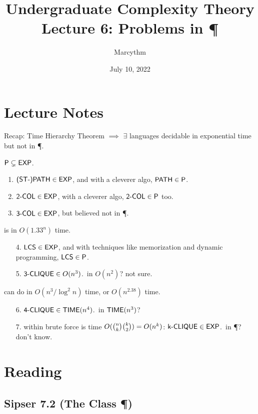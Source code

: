 \documentclass{article}
\title{Undergraduate Complexity Theory \\ Lecture 6: Problems in \P}
\author{Marcythm}
\date{July 10, 2022}
\begin{document}
\maketitle{}

\section{Lecture Notes}

Recap: Time Hierarchy Theorem \(\implies\) \(\exists\) languages decidable in exponential time but not in \P.


\begin{fact}
  \(\text{\sf P} \subsetneq \text{\sf EXP}\).
\end{fact}

\begin{enumerate}
  \item \( \text{\sf (ST-)PATH} \in \text{\sf EXP} \), and with a cleverer algo, \( \text{\sf PATH} \in \text{\sf P} \).
  \item \( \text{\sf 2-COL} \in \text{\sf EXP} \), with a cleverer algo, \( \text{\sf 2-COL} \in \text{\sf P} \) too.
  \item \( \text{\sf 3-COL} \in \text{\sf EXP} \), but believed not in \P.
\end{enumerate}

\begin{theorem}[BE '05]
   is in \(O(1.33^n)\) time.
\end{theorem}

\begin{enumerate}
  \item[4.] \( \text{\sf LCS} \in \text{\sf EXP}\), and with techniques like memorization and dynamic programming, \( \text{\sf LCS} \in \text{\sf P} \).
  \item[5.] \( \text{\sf 3-CLIQUE} \in O(n^3) \).\ in \(O(n^2)\)? not sure.
\end{enumerate}

\begin{fact}
  can do  in \(O(n^3 / \log^2 n)\) time, or \(O(n^{2.38})\) time.
\end{fact}

\begin{enumerate}
  \item[6.] \( \text{\sf 4-CLIQUE} \in \text{\sf TIME}(n^4) \).\ in \(\text{\sf TIME}(n^3)\)?
  \item[7.]  within brute force is time \(O\lparen\binom{n}{k} \binom{k}{2}\rparen = O(n^k)\): \( \text{\sf k-CLIQUE} \in \text{\sf EXP} \).\ in \P? don't know.
\end{enumerate}

\section{Reading}

\subsection{Sipser 7.2 (The Class \P)}
\end{document}
